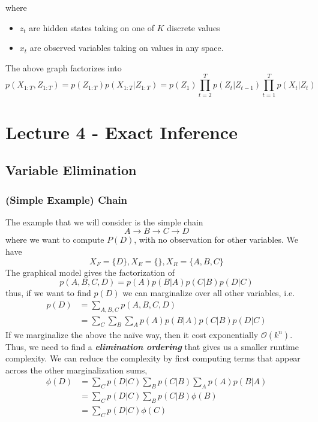 \documentclass[11pt]{article}
\begin{document}
where
\begin{itemize}
    \item $z_t$ are hidden states taking on one of $K$ discrete values
    \item $x_t$ are observed variables taking on values in any space.
\end{itemize}
The above graph factorizes into
\begin{equation}
    p\left(X_{1: T}, Z_{1: T}\right)=p\left(Z_{1: T}\right) p\left(X_{1: T} | Z_{1: T}\right)=p\left(Z_{1}\right) \prod_{t=2}^{T} p\left(Z_{t} | Z_{t-1}\right) \prod_{t=1}^{T} p\left(X_{t} | Z_{t}\right)
\end{equation}

\section{Lecture 4 - Exact Inference}
\subsection{Variable Elimination}
\subsubsection{(Simple Example) Chain}
The example that we will consider is the simple chain
\begin{equation}
    A \rightarrow B \rightarrow C \rightarrow D
\end{equation}
where we want to compute $P(D)$, with no observation for other variables. We have
\begin{equation}
    X_{F}=\{D\}, X_{E}=\{\}, X_{R}=\{A, B, C\}
\end{equation}
The graphical model gives the factorization of
\begin{equation}
    p(A, B, C, D)=p(A) p(B | A) p(C | B) p(D | C)
\end{equation}
thus, if we want to find $p(D)$ we can marginalize over all other variables, i.e.
\begin{align}
    p(D)&=\sum_{A, B, C} p(A, B, C, D) \\
    &=\sum_{C} \sum_{B} \sum_{A} p(A) p(B | A) p(C | B) p(D | C)
\end{align}
If we marginalize the above the na\"ive way, then it cost exponentially $\mathcal{O}(k^n)$. Thus, we need to find a \textit{\textbf{elimination ordering}} that gives us a smaller runtime complexity. We can reduce the complexity by first computing terms that appear across the other marginalization sums, 
\begin{align}
    \phi(D) 
    &= \sum_C p(D|C) \sum_B p(C|B) \sum_A p(A)p(B|A) \\
    &= \sum_C p(D|C) \sum_B p(C|B) \phi(B) \\
    &= \sum_C p(D|C) \phi(C)
\end{align}
\end{document}
